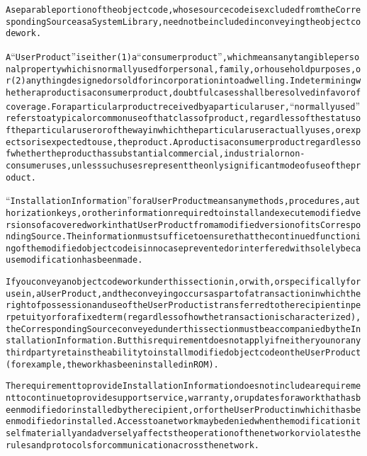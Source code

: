 \begin{alltt}
A separable portion of the object code, whose source code is excluded from the Corresponding Source as a System Library, need not be included in conveying the object code work.

A “User Product” is either (1) a “consumer product”, which means any tangible personal property which is normally used for personal, family, or household purposes, or (2) anything designed or sold for incorporation into a dwelling. In determining whether a product is a consumer product, doubtful cases shall be resolved in favor of coverage. For a particular product received by a particular user, “normally used” refers to a typical or common use of that class of product, regardless of the status of the particular user or of the way in which the particular user actually uses, or expects or is expected to use, the product. A product is a consumer product regardless of whether the product has substantial commercial, industrial or non-consumer uses, unless such uses represent the only significant mode of use of the product.

“Installation Information” for a User Product means any methods, procedures, authorization keys, or other information required to install and execute modified versions of a covered work in that User Product from a modified version of its Corresponding Source. The information must suffice to ensure that the continued functioning of the modified object code is in no case prevented or interfered with solely because modification has been made.

If you convey an object code work under this section in, or with, or specifically for use in, a User Product, and the conveying occurs as part of a transaction in which the right of possession and use of the User Product is transferred to the recipient in perpetuity or for a fixed term (regardless of how the transaction is characterized), the Corresponding Source conveyed under this section must be accompanied by the Installation Information. But this requirement does not apply if neither you nor any third party retains the ability to install modified object code on the User Product (for example, the work has been installed in ROM).

The requirement to provide Installation Information does not include a requirement to continue to provide support service, warranty, or updates for a work that has been modified or installed by the recipient, or for the User Product in which it has been modified or installed. Access to a network may be denied when the modification itself materially and adversely affects the operation of the network or violates the rules and protocols for communication across the network.


\end{alltt}
